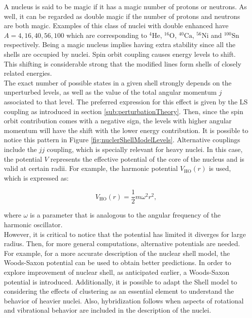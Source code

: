 \documentclass[openany]{book}
\begin{document}
A nucleus is said to be magic if it has a magic number of protons or neutrons. As well, it can be regarded as double magic if the number of protons and neutrons are both magic. Examples of this class of nuclei with double enhanced have $A = 4, 16, 40, 56, 100$ which are corresponding to $\mathrm{{}^{4}He}$, $\mathrm{{}^{16}O}$,  $\mathrm{{}^{40}Ca}$, $\mathrm{{}^{56}Ni}$ and $\mathrm{{}^{100}Sn}$ respectively. Being a magic nucleus implies having extra stability since all the shells are occupied by nuclei.  Spin orbit coupling causes energy levels to shift. This shifting is considerable strong that the modified lines form shells of closely related energies.   \\

The exact number of possible states in a given shell strongly depends on the unperturbed levels, as well as the value of the total angular momentum $j$ associated to that level.  The preferred expression for this effect is given by the LS coupling as introduced in section \ref{sub:perturbationTheory}. Then, since the spin orbit contribution comes with a negative sign, the levels with higher angular momentum will have the shift with the lower energy contribution. It is possible to notice this pattern in Figure \ref{fig:nuclerShellModelLevels}. Alternative couplings include the $jj$ coupling, which is specially relevant for heavy nuclei. In this case, the potential $V$ represents the effective potential of the core of the nucleus and is valid at certain radii. For example, the harmonic potential $V_{\mathrm{HO}}(r)$ is used, which is expressed as: 

\begin{equation} \label{eq:nuclearShell_harmonicOscillator}
	V_{\mathrm{HO}}(r) = \frac{1}{2}m\omega^2r^2,
\end{equation}

where $\omega$ is a parameter that is analogous to the angular frequency of the harmonic oscillator. \\

However, it is critical to notice that the potential has limited it diverges for large radius. Then, for more general computations, alternative potentials are needed.  For example, for a more accurate description of the nuclear shell model, the Woods-Saxon potential can be used to obtain better predictions. In order to explore improvement of nuclear shell, as anticipated earlier, a Woods-Saxon potential is introduced. Additionally, it is possible to adapt the Shell model to considering the effects of clustering as an essential element to understand the behavior of heavier nuclei. Also, hybridization follows when aspects of rotational and vibrational behavior are included in the description of the nuclei.  \\
\end{document}
